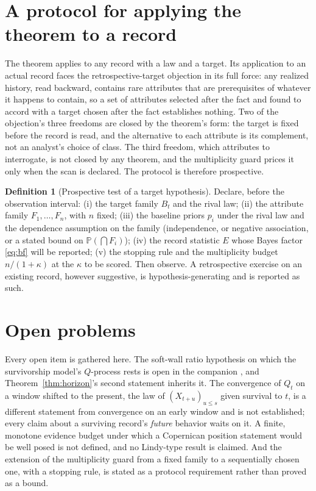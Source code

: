 \documentclass[11pt]{article}
\newcommand{\PP}{\mathbb{P}}
\theoremstyle{plain}
\theoremstyle{definition}
\newtheorem{definition}[theorem]{Definition}
\theoremstyle{remark}
\begin{document}
\section{A protocol for applying the theorem to a record}
\label{sec:protocol}

The theorem applies to any record with a law and a target. Its
application to an actual record faces the retrospective-target objection
in its full force: any realized history, read backward, contains rare
attributes that are prerequisites of whatever it happens to contain, so a
set of attributes selected after the fact and found to accord with a
target chosen after the fact establishes nothing. Two of the objection's
three freedoms are closed by the theorem's form: the target is fixed
before the record is read, and the alternative to each attribute is its
complement, not an analyst's choice of class. The third freedom, which
attributes to interrogate, is not closed by any theorem, and the
multiplicity guard prices it only when the scan is declared. The protocol
is therefore prospective.

\begin{definition}[Prospective test of a target hypothesis]\label{def:protocol}
Declare, before the observation interval: (i) the target family $B_t$ and
the rival law; (ii) the attribute family $F_1,\dots,F_n$, with $n$ fixed;
(iii) the baseline priors $p_i$ under the rival law and the dependence
assumption on the family (independence, or negative association, or a
stated bound on $\PP(\bigcap F_i)$); (iv) the record statistic $E$ whose
Bayes factor \eqref{eq:bf} will be reported; (v) the stopping rule and
the multiplicity budget $n/(1+\kappa)$ at the $\kappa$ to be scored. Then
observe. A retrospective exercise on an existing record, however
suggestive, is hypothesis-generating and is reported as such.
\end{definition}

\section{Open problems}\label{sec:open}

Every open item is gathered here. The soft-wall ratio hypothesis on which
the survivorship model's $Q$-process rests is open in the companion
\cite{SurvA}, and Theorem~\ref{thm:horizon}'s second statement inherits
it. The convergence of $Q_t$ on a window shifted to the present, the law
of $(X_{t+u})_{u\le s}$ given survival to $t$, is a different statement
from convergence on an early window and is not established; every claim
about a surviving record's \emph{future} behavior waits on it. A finite,
monotone evidence budget under which a Copernican position statement
would be well posed is not defined, and no Lindy-type result is claimed.
And the extension of the multiplicity guard from a fixed family to a
sequentially chosen one, with a stopping rule, is stated as a protocol
requirement rather than proved as a bound.
\end{document}
